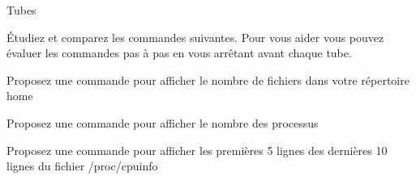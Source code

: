 \begin{exercice}
  \begin{exercicelet}{Tubes}
    \begin{questions}
    \item Étudiez et comparez les commandes suivantes. Pour vous aider
      vous pouvez évaluer les commandes pas à pas en vous arrêtant avant
      chaque tube.
      \small{ }
    \item Proposez une commande pour afficher le nombre de fichiers dans
      votre répertoire home
    \item Proposez une commande pour afficher le nombre des processus
    \item Proposez une commande pour afficher les premières 5 lignes des
      dernières 10 lignes du fichier /proc/cpuinfo
    \end{questions}
  \end{exercicelet}
\end{exercice}

